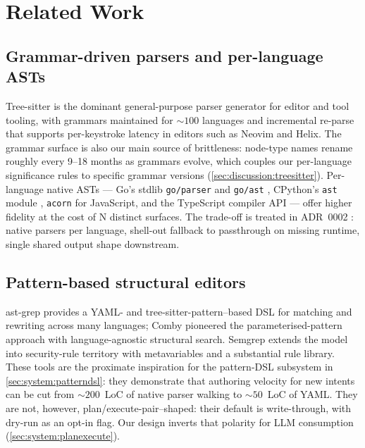 \section{Related Work}
\label{sec:related}

\subsection{Grammar-driven parsers and per-language ASTs}

Tree-sitter \cite{tree_sitter} is the dominant general-purpose parser
generator for editor and tool tooling, with grammars maintained for
$\sim 100$ languages and incremental re-parse that supports per-keystroke
latency in editors such as Neovim and Helix. The grammar surface is
also our main source of brittleness: node-type names rename roughly
every 9--18 months as grammars evolve, which couples our per-language
significance rules to specific grammar versions
(\cref{sec:discussion:treesitter}). Per-language native ASTs
--- Go's stdlib \texttt{go/parser} and \texttt{go/ast}
\cite{go_ast}, CPython's \texttt{ast} module \cite{python_ast},
\texttt{acorn} \cite{acorn} for JavaScript, and the TypeScript
compiler API \cite{ts_compiler} --- offer higher fidelity at the
cost of N distinct surfaces. The trade-off is treated in ADR~0002
\cite{blackrim_adr_0002}: native parsers per language, shell-out
fallback to passthrough on missing runtime, single shared output
shape downstream.

\subsection{Pattern-based structural editors}

ast-grep \cite{ast_grep} provides a YAML- and tree-sitter-pattern--based
DSL for matching and rewriting across many languages; Comby
\cite{comby} pioneered the parameterised-pattern approach with
language-agnostic structural search. Semgrep \cite{semgrep} extends the
model into security-rule territory with metavariables and a substantial
rule library. These tools are the proximate inspiration for the
pattern-DSL subsystem in \cref{sec:system:patterndsl}: they
demonstrate that authoring velocity for new intents can be cut from
$\sim 200$~LoC of native parser walking to $\sim 50$~LoC of YAML. They
are not, however, plan/execute-pair--shaped: their default is
write-through, with dry-run as an opt-in flag. Our design inverts that
polarity for LLM consumption (\cref{sec:system:planexecute}).

